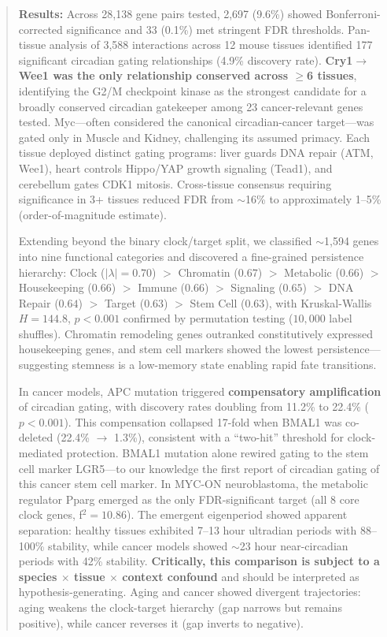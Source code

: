 \documentclass[11pt,a4paper]{article}
\begin{document}
\begin{abstract}
\textbf{Results:} Across 28,138 gene pairs tested, 2,697 (9.6\%) showed Bonferroni-corrected significance and 33 (0.1\%) met stringent FDR thresholds. Pan-tissue analysis of 3,588 interactions across 12 mouse tissues identified 177 significant circadian gating relationships (4.9\% discovery rate). \textbf{Cry1$\rightarrow$Wee1 was the only relationship conserved across $\geq$6 tissues}, identifying the G2/M checkpoint kinase as the strongest candidate for a broadly conserved circadian gatekeeper among 23 cancer-relevant genes tested. Myc---often considered the canonical circadian-cancer target---was gated only in Muscle and Kidney, challenging its assumed primacy. Each tissue deployed distinct gating programs: liver guards DNA repair (ATM, Wee1), heart controls Hippo/YAP growth signaling (Tead1), and cerebellum gates CDK1 mitosis. Cross-tissue consensus requiring significance in 3+ tissues reduced FDR from $\sim$16\% to approximately 1--5\% (order-of-magnitude estimate).

Extending beyond the binary clock/target split, we classified $\sim$1,594 genes into nine functional categories and discovered a fine-grained persistence hierarchy: Clock ($|\lambda|=0.70$) $>$ Chromatin ($0.67$) $>$ Metabolic ($0.66$) $>$ Housekeeping ($0.66$) $>$ Immune ($0.66$) $>$ Signaling ($0.65$) $>$ DNA Repair ($0.64$) $>$ Target ($0.63$) $>$ Stem Cell ($0.63$), with Kruskal-Wallis $H=144.8$, $p<0.001$ confirmed by permutation testing ($10{,}000$ label shuffles). Chromatin remodeling genes outranked constitutively expressed housekeeping genes, and stem cell markers showed the lowest persistence---suggesting stemness is a low-memory state enabling rapid fate transitions.

In cancer models, APC mutation triggered \textbf{compensatory amplification} of circadian gating, with discovery rates doubling from 11.2\% to 22.4\% ($p < 0.001$). This compensation collapsed 17-fold when BMAL1 was co-deleted (22.4\% $\rightarrow$ 1.3\%), consistent with a ``two-hit'' threshold for clock-mediated protection. BMAL1 mutation alone rewired gating to the stem cell marker LGR5---to our knowledge the first report of circadian gating of this cancer stem cell marker. In MYC-ON neuroblastoma, the metabolic regulator Pparg emerged as the only FDR-significant target (all 8 core clock genes, f$^2 = 10.86$). The emergent eigenperiod showed apparent separation: healthy tissues exhibited 7--13 hour ultradian periods with 88--100\% stability, while cancer models showed $\sim$23 hour near-circadian periods with 42\% stability. \textbf{Critically, this comparison is subject to a species $\times$ tissue $\times$ context confound} and should be interpreted as hypothesis-generating. Aging and cancer showed divergent trajectories: aging weakens the clock-target hierarchy (gap narrows but remains positive), while cancer reverses it (gap inverts to negative).


\end{abstract}
\end{document}
